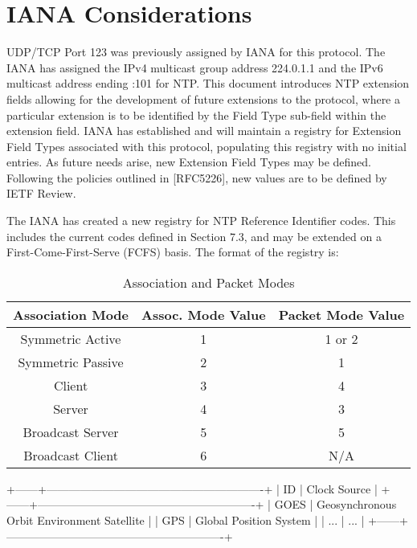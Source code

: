 \chapter{IANA Considerations}

UDP/TCP Port 123 was previously assigned by IANA for this protocol.
The IANA has assigned the IPv4 multicast group address 224.0.1.1 and
the IPv6 multicast address ending :101 for NTP.  This document
introduces NTP extension fields allowing for the development of
future extensions to the protocol, where a particular extension is to
be identified by the Field Type sub-field within the extension field.
IANA has established and will maintain a registry for Extension Field
Types associated with this protocol, populating this registry with no
initial entries.  As future needs arise, new Extension Field Types
may be defined.  Following the policies outlined in [RFC5226], new
values are to be defined by IETF Review.

The IANA has created a new registry for NTP Reference Identifier
codes.  This includes the current codes defined in Section 7.3, and
may be extended on a First-Come-First-Serve (FCFS) basis.  The format
of the registry is:

\begin{table}[htb]
\center
\begin{tabular}{c | c | c}
Association Mode & Assoc. Mode Value & Packet Mode Value \\
\hline
\hline
Symmetric Active & 1 & 1 or 2 \\
Symmetric Passive & 2 & 1 \\
Client & 3 & 4 \\
Server & 4 & 3 \\
Broadcast Server & 5 & 5 \\
Broadcast Client & 6 & N/A \\
\hline
\end{tabular}
\label{association_and_packet_modes}
\caption{Association and Packet Modes}
\end{table}

  +------+----------------------------------------------------------+
  | ID   | Clock Source                                             |
  +------+----------------------------------------------------------+
  | GOES | Geosynchronous Orbit Environment Satellite               |
  | GPS  | Global Position System                                   |
  | ...  | ...                                                      |
  +------+----------------------------------------------------------+


